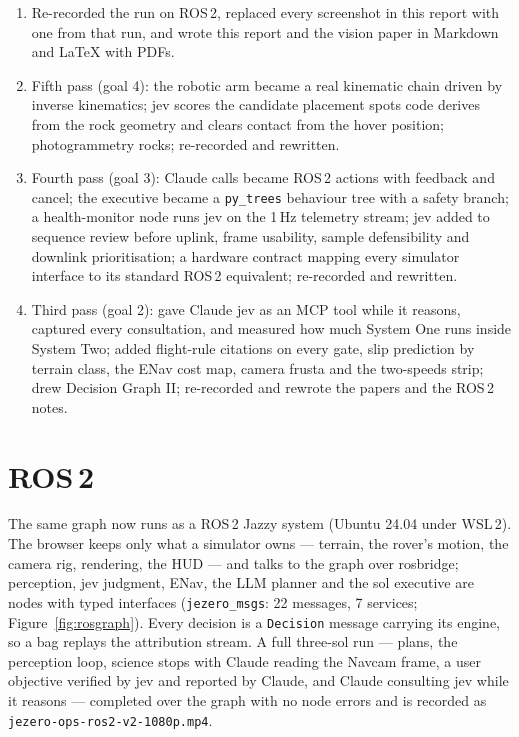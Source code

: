 \documentclass[11pt]{article}
\begin{document}
\begin{enumerate}
\item Re-recorded the run on ROS\,2, replaced every screenshot in this report with one from that run, and wrote this report and the vision paper in Markdown and \LaTeX{} with PDFs.
\item Fifth pass (goal 4): the robotic arm became a real kinematic chain driven by inverse kinematics; jev scores the candidate placement spots code derives from the rock geometry and clears contact from the hover position; photogrammetry rocks; re-recorded and rewritten.
\item Fourth pass (goal 3): Claude calls became ROS\,2 actions with feedback and cancel; the executive became a \texttt{py\_trees} behaviour tree with a safety branch; a health-monitor node runs jev on the 1\,Hz telemetry stream; jev added to sequence review before uplink, frame usability, sample defensibility and downlink prioritisation; a hardware contract mapping every simulator interface to its standard ROS\,2 equivalent; re-recorded and rewritten.
\item Third pass (goal 2): gave Claude jev as an MCP tool while it reasons, captured every consultation, and measured how much System One runs inside System Two; added flight-rule citations on every gate, slip prediction by terrain class, the ENav cost map, camera frusta and the two-speeds strip; drew Decision Graph II; re-recorded and rewrote the papers and the ROS\,2 notes.
\end{enumerate}

\section{ROS\,2}
\label{sec:ros2}
The same graph now runs as a ROS\,2 Jazzy system (Ubuntu 24.04 under WSL\,2). The browser keeps only what a simulator owns --- terrain, the rover's motion, the camera rig, rendering, the HUD --- and talks to the graph over rosbridge; perception, jev judgment, ENav, the LLM planner and the sol executive are nodes with typed interfaces (\texttt{jezero\_msgs}: 22 messages, 7 services; Figure~\ref{fig:rosgraph}). Every decision is a \texttt{Decision} message carrying its engine, so a bag replays the attribution stream. A full three-sol run --- plans, the perception loop, science stops with Claude reading the Navcam frame, a user objective verified by jev and reported by Claude, and Claude consulting jev while it reasons --- completed over the graph with no node errors and is recorded as \texttt{jezero-ops-ros2-v2-1080p.mp4}.
\end{document}
